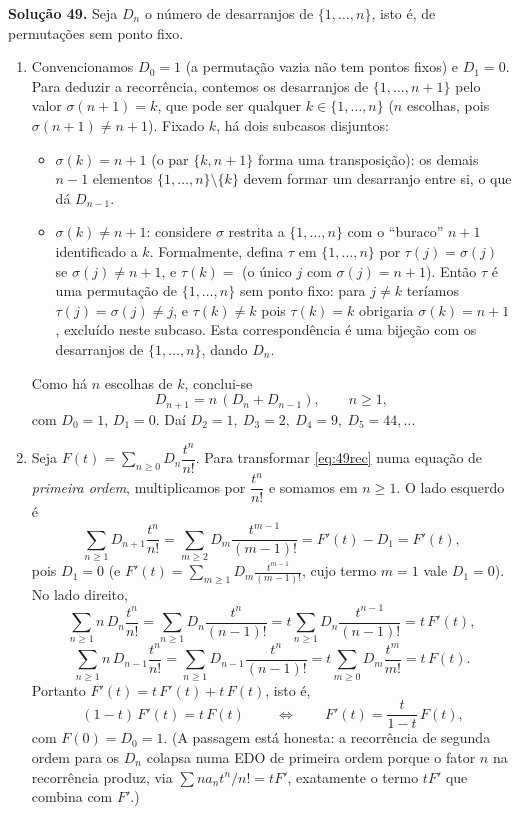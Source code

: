 \bigskip\noindent\textbf{Solução 49.}\quad
Seja $D_n$ o número de desarranjos de $\{1,\dots,n\}$, isto é, de permutações sem ponto fixo.

\begin{enumerate}[label=(\alph*)]

\item Convencionamos $D_0=1$ (a permutação vazia não tem pontos fixos) e $D_1=0$. Para deduzir a recorrência, contemos os desarranjos de $\{1,\dots,n+1\}$ pelo valor $\sigma(n+1)=k$, que pode ser qualquer $k\in\{1,\dots,n\}$ ($n$ escolhas, pois $\sigma(n+1)\neq n+1$). Fixado $k$, há dois subcasos disjuntos:
\begin{itemize}
\item \emph{$\sigma(k)=n+1$} (o par $\{k,n+1\}$ forma uma transposição): os demais $n-1$ elementos $\{1,\dots,n\}\setminus\{k\}$ devem formar um desarranjo entre si, o que dá $D_{n-1}$.
\item \emph{$\sigma(k)\neq n+1$}: considere $\sigma$ restrita a $\{1,\dots,n\}$ com o ``buraco'' $n+1$ identificado a $k$. Formalmente, defina $\tau$ em $\{1,\dots,n\}$ por $\tau(j)=\sigma(j)$ se $\sigma(j)\neq n+1$, e $\tau(k)=$ (o único $j$ com $\sigma(j)=n+1$). Então $\tau$ é uma permutação de $\{1,\dots,n\}$ sem ponto fixo: para $j\neq k$ teríamos $\tau(j)=\sigma(j)\neq j$, e $\tau(k)\neq k$ pois $\tau(k)=k$ obrigaria $\sigma(k)=n+1$, excluído neste subcaso. Esta correspondência é uma bijeção com os desarranjos de $\{1,\dots,n\}$, dando $D_n$.
\end{itemize}
Como há $n$ escolhas de $k$, conclui-se
\begin{equation}\label{eq:49rec}
D_{n+1}=n\,(D_n+D_{n-1}),\qquad n\ge1,
\end{equation}
com $D_0=1$, $D_1=0$. Daí $D_2=1,\ D_3=2,\ D_4=9,\ D_5=44,\dots$

\item Seja $F(t)=\sum_{n\ge0}D_n\dfrac{t^n}{n!}$. Para transformar \eqref{eq:49rec} numa equação de \emph{primeira ordem}, multiplicamos por $\dfrac{t^n}{n!}$ e somamos em $n\ge1$. O lado esquerdo é
\[
\sum_{n\ge1}D_{n+1}\frac{t^n}{n!}=\sum_{m\ge2}D_m\frac{t^{m-1}}{(m-1)!}=F'(t)-D_1=F'(t),
\]
pois $D_1=0$ (e $F'(t)=\sum_{m\ge1}D_m\frac{t^{m-1}}{(m-1)!}$, cujo termo $m=1$ vale $D_1=0$). No lado direito,
\[
\sum_{n\ge1}n\,D_n\frac{t^n}{n!}=\sum_{n\ge1}D_n\frac{t^n}{(n-1)!}=t\sum_{n\ge1}D_n\frac{t^{n-1}}{(n-1)!}=t\,F'(t),
\]
\[
\sum_{n\ge1}n\,D_{n-1}\frac{t^n}{n!}=\sum_{n\ge1}D_{n-1}\frac{t^n}{(n-1)!}=t\sum_{m\ge0}D_m\frac{t^m}{m!}=t\,F(t).
\]
Portanto $F'(t)=t\,F'(t)+t\,F(t)$, isto é,
\begin{equation}\label{eq:49ode}
\boxed{\,(1-t)\,F'(t)=t\,F(t)\,}\qquad\Longleftrightarrow\qquad F'(t)=\frac{t}{1-t}\,F(t),
\end{equation}
com $F(0)=D_0=1$. (A passagem está honesta: a recorrência de segunda ordem para os $D_n$ colapsa numa EDO de primeira ordem porque o fator $n$ na recorrência produz, via $\sum n a_n t^n/n!=tF'$, exatamente o termo $tF'$ que combina com $F'$.)


\end{enumerate}
